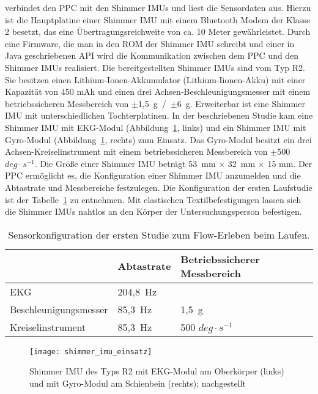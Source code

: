 \label{par:die_sensorkomponente}

verbindet den \ac{PPC} mit den Shimmer \acp{IMU} und liest die Sensordaten aus. Hierzu ist die Hauptplatine einer Shimmer \ac{IMU} mit einem Bluetooth Modem der Klasse 2 besetzt, das eine Übertragungsreichweite von ca. 10 Meter gewährleistet. Durch eine Firmware, die man in den \acs{ROM} der Shimmer \ac{IMU} schreibt und einer in Java geschriebenen \acs{API} wird die Kommunikation zwischen dem \ac{PPC} und den Shimmer \acp{IMU} realisiert. Die bereitgestellten Shimmer \acp{IMU} sind vom Typ R2. Sie besitzen einen Lithium-Ionen-Akkumulator (Lithium-Iionen-Akku) mit einer Kapazität von 450 mAh und einen drei Achsen-Beschleunigungsmesser mit einem betriebssicheren Messbereich von \mbox{$\pm$1,5~g / $\pm$6 g}. Erweiterbar ist eine Shimmer \ac{IMU} mit unterschiedlichen Tochterplatinen. In der beschriebenen Studie kam eine Shimmer \ac{IMU} mit \ac{EKG}-Modul (Abbildung~\ref{fig:shimmer_imu_einsatz}, links) und ein Shimmer \ac{IMU} mit Gyro-Modul (Abbildung~\ref{fig:shimmer_imu_einsatz}, rechts) zum Einsatz. Das Gyro-Modul besitzt ein drei Achsen-Kreiselinstrument mit einem betriebssicheren Messbereich von \mbox{$\pm$500 $deg \cdot s^{-1}$}. Die Größe einer Shimmer \ac{IMU} beträgt 53~mm $\times$ 32~mm $\times$ 15 mm. Der \ac{PPC} ermöglicht es, die Konfiguration einer Shimmer \ac{IMU} anzumelden und die Abtastrate und Messbereiche festzulegen. Die Konfiguration der ersten Laufstudie ist der Tabelle~\ref{tab:sensorkonfiguration_1} zu entnehmen. Mit elastischen Textilbefestigungen lassen sich die Shimmer \acp{IMU} nahtlos an den Körper der Untersuchungsperson befestigen. 
\begin{table}
	[!htb] \caption[Sensorkonfiguration (Erste Studie: Laufen)]{Sensorkonfiguration der ersten Studie zum Flow-Erleben beim Laufen.
	} \label{tab:sensorkonfiguration_1} 
	\begin{tabularx}
		{ 
		\textwidth}{p{} p{} p{}} \toprule & Abtastrate & Betriebssicherer Messbereich \\
		\midrule \ac{EKG} & 204,8~Hz & \\
		Beschleunigungsmesser & 85,3~Hz & 1,5~g \\
		Kreiselinstrument & 85,3~Hz & 500 $deg \cdot s^{-1}$ \\
		\bottomrule 
	\end{tabularx}
\end{table}
 
\begin{figure}
	[!htb] \centering 
	\texttt{[image: shimmer\_imu\_einsatz]} \caption[Shimmer \acs{IMU}s mit Modulen]{Shimmer \acs{IMU} des Typs R2 mit \ac{EKG}-Modul am Oberkörper (links) und mit Gyro-Modul am Schienbein (rechts); nachgestellt} \label{fig:shimmer_imu_einsatz} 
\end{figure}

